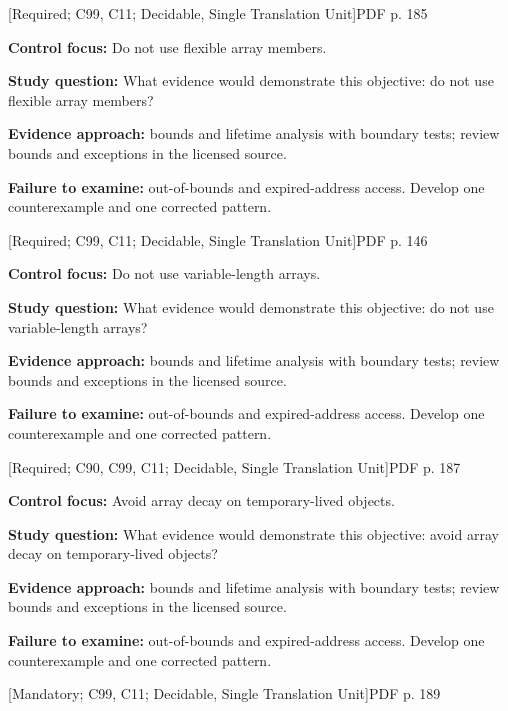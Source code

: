 \documentclass[10pt,letterpaper]{article}
\begin{document}
\smallskip
{}
 \textsf{\footnotesize [Required; C99, C11; Decidable, Single Translation Unit]}\hfill{\footnotesize PDF p. 185}\par
\textbf{Control focus:} Do not use flexible array members.\par
\textbf{Study question:} What evidence would demonstrate this objective: do not use flexible array members?\par
\textbf{Evidence approach:} bounds and lifetime analysis with boundary tests; review bounds and exceptions in the licensed source.\par
\textbf{Failure to examine:} out-of-bounds and expired-address access. Develop one counterexample and one corrected pattern.\par
\smallskip
{}
 \textsf{\footnotesize [Required; C99, C11; Decidable, Single Translation Unit]}\hfill{\footnotesize PDF p. 146}\par
\textbf{Control focus:} Do not use variable-length arrays.\par
\textbf{Study question:} What evidence would demonstrate this objective: do not use variable-length arrays?\par
\textbf{Evidence approach:} bounds and lifetime analysis with boundary tests; review bounds and exceptions in the licensed source.\par
\textbf{Failure to examine:} out-of-bounds and expired-address access. Develop one counterexample and one corrected pattern.\par
\smallskip
{}
 \textsf{\footnotesize [Required; C90, C99, C11; Decidable, Single Translation Unit]}\hfill{\footnotesize PDF p. 187}\par
\textbf{Control focus:} Avoid array decay on temporary-lived objects.\par
\textbf{Study question:} What evidence would demonstrate this objective: avoid array decay on temporary-lived objects?\par
\textbf{Evidence approach:} bounds and lifetime analysis with boundary tests; review bounds and exceptions in the licensed source.\par
\textbf{Failure to examine:} out-of-bounds and expired-address access. Develop one counterexample and one corrected pattern.\par
\smallskip
{}
 \textsf{\footnotesize [Mandatory; C99, C11; Decidable, Single Translation Unit]}\hfill{\footnotesize PDF p. 189}\par
\end{document}
